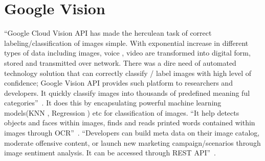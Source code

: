 \section{Google Vision}


``Google Cloud Vision API has made the herculean task of correct 
labeling/classification of images simple. With exponential increase 
in different types of data including images, voice , video are 
transformed into digital form, stored and transmitted over network. 
There was a dire need of automated technology solution that can 
correctly classify / label images with high level of confidence; 
Google Vision API provides such platform to researchers and developers. 
It quickly classify images into thousands of predefined 
meaning ful categories''~\cite{hid-sp18-523-www-google-vision}. 
It does this by encapsulating powerful machine learning 
models(KNN , Regression ) etc for classification of images. 
``It help detects objects and faces within images, finds and reads 
printed words contained within images through 
OCR''~\cite{hid-sp18-523-www-google-vision}. 
``Developers can build meta data on their image catalog, moderate 
offensive content, or launch new marketing campaign/scenarios through 
image sentiment analysis. It can be accessed 
through REST API''~\cite{hid-sp18-523-www-google-vision}.

